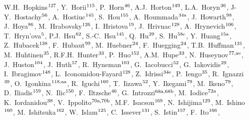 \begin{flushleft}
W.H.~Hopkins$^\textrm{\scriptsize 127}$,    
Y.~Horii$^\textrm{\scriptsize 115}$,    
P.~Horn$^\textrm{\scriptsize 46}$,    
A.J.~Horton$^\textrm{\scriptsize 149}$,    
L.A.~Horyn$^\textrm{\scriptsize 36}$,    
J-Y.~Hostachy$^\textrm{\scriptsize 56}$,    
A.~Hostiuc$^\textrm{\scriptsize 145}$,    
S.~Hou$^\textrm{\scriptsize 155}$,    
A.~Hoummada$^\textrm{\scriptsize 34a}$,    
J.~Howarth$^\textrm{\scriptsize 98}$,    
J.~Hoya$^\textrm{\scriptsize 86}$,    
M.~Hrabovsky$^\textrm{\scriptsize 126}$,    
I.~Hristova$^\textrm{\scriptsize 19}$,    
J.~Hrivnac$^\textrm{\scriptsize 128}$,    
A.~Hrynevich$^\textrm{\scriptsize 106}$,    
T.~Hryn'ova$^\textrm{\scriptsize 5}$,    
P.J.~Hsu$^\textrm{\scriptsize 62}$,    
S.-C.~Hsu$^\textrm{\scriptsize 145}$,    
Q.~Hu$^\textrm{\scriptsize 29}$,    
S.~Hu$^\textrm{\scriptsize 58c}$,    
Y.~Huang$^\textrm{\scriptsize 15a}$,    
Z.~Hubacek$^\textrm{\scriptsize 138}$,    
F.~Hubaut$^\textrm{\scriptsize 99}$,    
M.~Huebner$^\textrm{\scriptsize 24}$,    
F.~Huegging$^\textrm{\scriptsize 24}$,    
T.B.~Huffman$^\textrm{\scriptsize 131}$,    
M.~Huhtinen$^\textrm{\scriptsize 35}$,    
R.F.H.~Hunter$^\textrm{\scriptsize 33}$,    
P.~Huo$^\textrm{\scriptsize 152}$,    
A.M.~Hupe$^\textrm{\scriptsize 33}$,    
N.~Huseynov$^\textrm{\scriptsize 77,ae}$,    
J.~Huston$^\textrm{\scriptsize 104}$,    
J.~Huth$^\textrm{\scriptsize 57}$,    
R.~Hyneman$^\textrm{\scriptsize 103}$,    
G.~Iacobucci$^\textrm{\scriptsize 52}$,    
G.~Iakovidis$^\textrm{\scriptsize 29}$,    
I.~Ibragimov$^\textrm{\scriptsize 148}$,    
L.~Iconomidou-Fayard$^\textrm{\scriptsize 128}$,    
Z.~Idrissi$^\textrm{\scriptsize 34e}$,    
P.~Iengo$^\textrm{\scriptsize 35}$,    
R.~Ignazzi$^\textrm{\scriptsize 39}$,    
O.~Igonkina$^\textrm{\scriptsize 118,aa}$,    
R.~Iguchi$^\textrm{\scriptsize 160}$,    
T.~Iizawa$^\textrm{\scriptsize 52}$,    
Y.~Ikegami$^\textrm{\scriptsize 79}$,    
M.~Ikeno$^\textrm{\scriptsize 79}$,    
D.~Iliadis$^\textrm{\scriptsize 159}$,    
N.~Ilic$^\textrm{\scriptsize 150}$,    
F.~Iltzsche$^\textrm{\scriptsize 46}$,    
G.~Introzzi$^\textrm{\scriptsize 68a,68b}$,    
M.~Iodice$^\textrm{\scriptsize 72a}$,    
K.~Iordanidou$^\textrm{\scriptsize 38}$,    
V.~Ippolito$^\textrm{\scriptsize 70a,70b}$,    
M.F.~Isacson$^\textrm{\scriptsize 169}$,    
N.~Ishijima$^\textrm{\scriptsize 129}$,    
M.~Ishino$^\textrm{\scriptsize 160}$,    
M.~Ishitsuka$^\textrm{\scriptsize 162}$,    
W.~Islam$^\textrm{\scriptsize 125}$,    
C.~Issever$^\textrm{\scriptsize 131}$,    
S.~Istin$^\textrm{\scriptsize 157}$,    
F.~Ito$^\textrm{\scriptsize 166}$,    

\end{flushleft}
